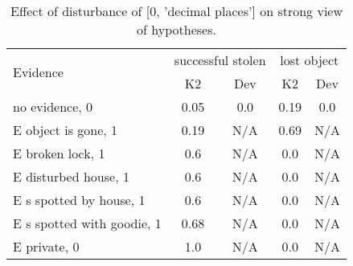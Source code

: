 \begin{table}\begin{tabular}{l|cc|cc}\toprule\multirow{2}{*}{Evidence} & \multicolumn{2}{c}{successful stolen}& \multicolumn{2}{c}{lost object}\\& {K2} & {Dev}& {K2} & {Dev}\\\midrule
no evidence, 0 & \cellcolor{Bittersweet}0.05&\cellcolor{Bittersweet}0.0&\cellcolor{Bittersweet}0.19&\cellcolor{Bittersweet}0.0\\E object is gone, 1 & \cellcolor{Bittersweet}0.19&\cellcolor{Bittersweet}N/A&\cellcolor{Bittersweet}0.69&\cellcolor{Bittersweet}N/A\\E broken lock, 1 & \cellcolor{Bittersweet}0.6&\cellcolor{Bittersweet}N/A&\cellcolor{Bittersweet}0.0&\cellcolor{Bittersweet}N/A\\E disturbed house, 1 & \cellcolor{Bittersweet}0.6&\cellcolor{Bittersweet}N/A&\cellcolor{Bittersweet}0.0&\cellcolor{Bittersweet}N/A\\E s spotted by house, 1 & \cellcolor{Bittersweet}0.6&\cellcolor{Bittersweet}N/A&\cellcolor{Bittersweet}0.0&\cellcolor{Bittersweet}N/A\\E s spotted with goodie, 1 & \cellcolor{Bittersweet}0.68&\cellcolor{Bittersweet}N/A&\cellcolor{Bittersweet}0.0&\cellcolor{Bittersweet}N/A\\E private, 0 & \cellcolor{Bittersweet}1.0&\cellcolor{Bittersweet}N/A&\cellcolor{Bittersweet}0.0&\cellcolor{Bittersweet}N/A\\\bottomrule\end{tabular}\caption{Effect of disturbance of [0, 'decimal places'] on strong view of hypotheses.}\end{table}